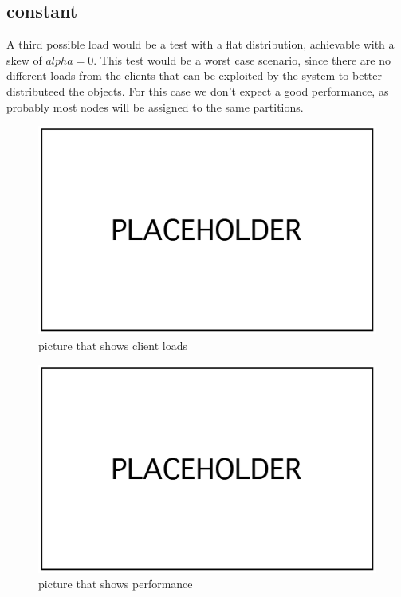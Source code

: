 \subsection{constant}\label{sec:constant}
A third possible load would be a test with a flat distribution, achievable with a skew of $alpha = 0$. This test would be a worst case scenario, since there are no different loads from the clients that can be exploited by the system to better distributeed the objects. For this case we don't expect a good performance, as probably most nodes will be assigned to the same partitions.

\begin{figure}[!htb]
  \centering
  \includegraphics[width=\textwidth,height=\textheight,keepaspectratio]{img/placeholder.png}
  \caption[caption]{ picture that shows client loads }
  \label{fig:constant-loads}
\end{figure}

\begin{figure}[!htb]
  \centering
  \includegraphics[width=\textwidth,height=\textheight,keepaspectratio]{img/placeholder.png}
  \caption[caption]{ picture that shows performance }
  \label{fig:constant-performance}
\end{figure}

